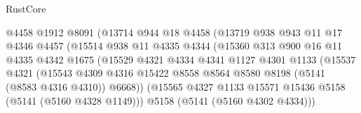 \begin{lexlean}{RustCore}
\begin{coremodule}
                                @4458
                                @1912
                                @8091
                                (@13714
                                  @944
                                  @18
                                  @4458
                                  (@13719
                                    @938
                                    @943
                                    @11
                                    @17
                                    @4346
                                    @4457
                                    (@15514
                                      @938
                                      @11
                                      @4335
                                      @4344
                                      (@15360
                                        @313
                                        @900
                                        @16
                                        @11
                                        @4335
                                        @4342
                                        @1675
                                        (@15529
                                          @4321
                                          @4334
                                          @4341
                                          @1127
                                          @4301
                                          @1133
                                          (@15537
                                            @4321
                                            (@15543
                                              @4309
                                              @4316
                                              @15422
                                              @8558
                                              @8564
                                              @8580
                                              @8198
                                              (@5141 (@8583 @4316 @4310))
                                              @6668))
                                          (@15565
                                            @4327
                                            @1133
                                            @15571
                                            @15436
                                            @5158
                                            (@5141 (@5160 @4328 @1149)))
                                          @5158
                                          (@5141 (@5160 @4302 @4334)))

\end{coremodule}
\end{lexlean}
